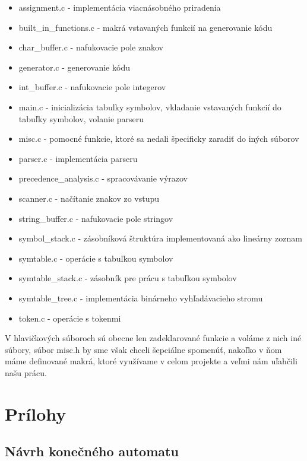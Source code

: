 \documentclass[a4paper, 12pt]{article}
\begin{document}
\begin{itemize}
    \item assignment.c - implementácia viacnásobného priradenia
    \item built\_in\_functions.c - makrá vstavaných funkcií na generovanie kódu
    \item char\_buffer.c - nafukovacie pole znakov
    \item generator.c - generovanie kódu
    \item int\_buffer.c - nafukovacie pole integerov
    \item main.c - inicializácia tabulky symbolov, vkladanie vstavaných funkcií do tabuľky symbolov, volanie parseru
    \item misc.c - pomocné funkcie, ktoré sa nedali špecificky zaradiť do iných súborov
    \item parser.c - implementácia parseru
    \item precedence\_analysis.c - spracovávanie výrazov
    \item scanner.c - načítanie znakov zo vstupu
    \item string\_buffer.c - nafukovacie pole stringov
    \item symbol\_stack.c - zásobníková štruktúra implementovaná ako lineárny zoznam 
    \item symtable.c - operácie s tabuľkou symbolov
    \item symtable\_stack.c - zásobník pre prácu s tabuľkou symbolov
    \item symtable\_tree.c - implementácia binárneho vyhľadávacieho stromu
    \item token.c - operácie s tokenmi
\end{itemize}

\noindent V hlavičkových súboroch sú obecne len zadeklarované funkcie a voláme z nich iné súbory, súbor misc.h by sme však chceli šepciálne spomenúť, nakoľko v ňom máme definované makrá, ktoré využívame v celom projekte a veľmi nám uľahčili našu prácu. 

\section{Prílohy}

\subsection{Návrh konečného automatu}
\end{document}
